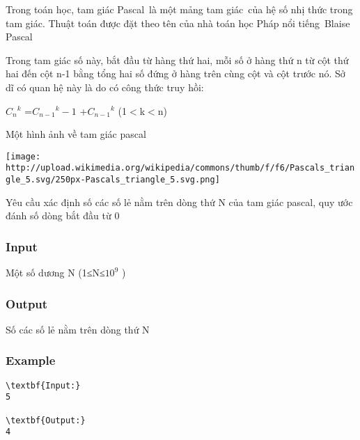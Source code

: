 



   Trong toán học, tam giác Pascal là một mảng tam giác của hệ số nhị thức trong tam giác. Thuật toán được đặt theo tên của nhà toán học Pháp nổi tiếng Blaise Pascal  

   Trong tam giác số này, bắt đầu từ hàng thứ hai, mỗi số ở hàng thứ n từ cột thứ hai đến cột n-1 bằng tổng hai số đứng ở hàng trên cùng cột và cột trước nó. Sở dĩ có quan hệ này là do có công thức truy hồi:  

   $C_{n}$$^    k   $   =$C_{n-1}$$^    k-1   $   +$C_{n-1}$$^    k   $   (1$<$k$<$n)  

   Một hình ảnh về tam giác pascal  


\texttt{[image: http://upload.wikimedia.org/wikipedia/commons/thumb/f/f6/Pascals\_triangle\_5.svg/250px-Pascals\_triangle\_5.svg.png]}

   Yêu cầu xác định số các số lẻ nằm trên dòng thứ N của tam giác pascal, quy ước đánh số dòng bắt đầu từ 0  

\subsubsection{   Input  }

   Một số dương N (1≤N≤$10^{9}$   )  

\subsubsection{   Output  }

   Số các số lẻ nằm trên dòng thứ N  

\subsubsection{   Example  }
\begin{verbatim}
\textbf{Input:}
5

\textbf{Output:}
4\end{verbatim}
